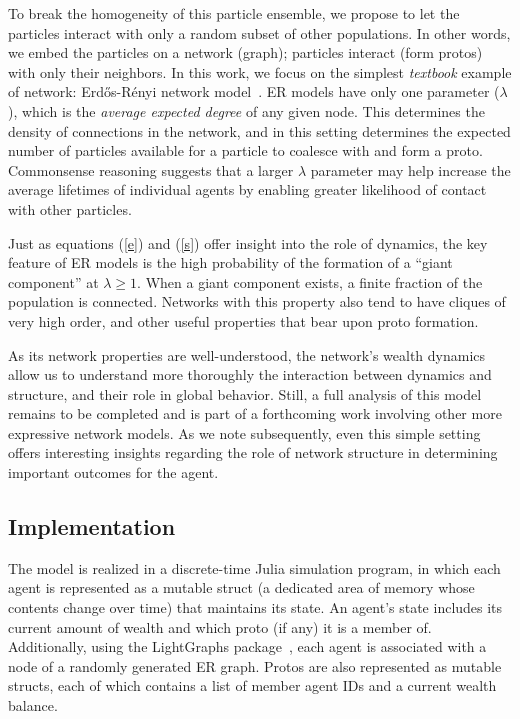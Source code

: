 To break the homogeneity of this particle ensemble, we propose to let the particles interact with only a random subset of other populations. In other words, we embed the particles on a network (graph); particles interact (form protos) with only their neighbors. In this work, we focus on the simplest \textit{textbook} example of network: Erd\H{o}s-R\'{e}nyi network model~\cite{newman2018networks}. ER models have only one parameter ($\lambda$), which is the \textit{average expected degree} of any given node. This determines the density of connections in the network, and in this setting determines the expected number of particles available for a particle to coalesce with and form a proto. Commonsense reasoning suggests that a larger $\lambda$ parameter may help increase the average lifetimes of individual agents by enabling greater likelihood of contact with other particles. 

Just as equations (\ref{e}) and (\ref{s}) offer insight into the role of dynamics, the key feature of ER models is the high probability of the formation of a ``giant component'' at $\lambda \ge 1$. When a giant component exists, a finite fraction of the population is connected. Networks with this property also tend to have cliques of very high order, and other useful properties that bear upon proto formation.

As its network properties are well-understood, the network's wealth dynamics allow us to understand more thoroughly the interaction between dynamics and structure, and their role in global behavior. Still, a full analysis of this model remains to be completed and is part of a forthcoming work involving other more expressive network models. As we note subsequently, even this simple setting offers interesting insights regarding the role of network structure in determining important outcomes for the agent. 


\subsection{Implementation}


The model is realized in a discrete-time Julia simulation program, in which each agent is represented as a mutable struct (a dedicated area of memory whose contents change over time) that maintains its state. An agent's state includes its current amount of wealth and which proto (if any) it is a member of. Additionally, using the LightGraphs package~\cite{LightGraphs-2017}, each agent is associated with a node of a randomly generated ER graph. Protos are also represented as mutable structs, each of which contains a list of member agent IDs and a current wealth balance.

